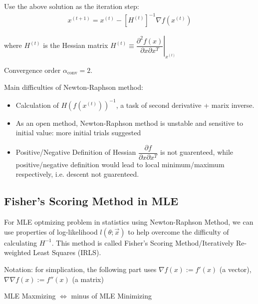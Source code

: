     Use the above solution as the iteration step:
    \begin{align}
        x^{(t+1)}=x^{(t)} - \left[H^{(t)}\right]^{-1}\nabla f(x^{(t)})
    \end{align}
    
    where $ H^{(t)} $ is the Hessian matrix $ H^{(t)}\equiv \left.\dfrac{\partial^{2}f(x) }{\partial x\partial x^T}\right|_{x^{(t)}} $
    
    Convergence order $ \alpha_\mathrm{conv} =2 $.

    \begin{point}
        Main difficulties of Newton-Raphson method: 
    \end{point}

    \begin{itemize}[topsep=2pt,itemsep=0pt]
        \item Calculation of $ H(f(x^{(t)}))^{-1} $, a task of second derivative + marix inverse.
        \item As an open method, Newton-Raphson  method is unstable and sensitive to initial value: more initial trials suggested
        \item Positive/Negative Definition of Hessian $ \dfrac{\partial f}{\partial x\partial x ^T} $ is not guarenteed, while positive/negative definition would lead to local minimum/maximum respectively, i.e. descent not guarenteed.
    \end{itemize}
    
        
    
\subsection{Fisher's Scoring Method in MLE}\label{SubSubSectionFisherScoringMethod}
    \hypertarget{FSNRMethod}{}For MLE optmizing problem in statistics using Newton-Raphson Method, we can use properties of log-likelihood $ l(\theta ;\vec{x}) $ to help overcome the difficulty of calculating $ H^{-1} $. This method is called Fisher's Scoring Method/Iteratively Re-weighted Least Squares (IRLS).

    Notation: for simplication, the following part uses $ \nabla f(x):=f'(x) $ (a vector), $ \nabla\nabla f(x):=f''(x) $ (a matrix)

\begin{point}
    MLE Maxmizing $ \Leftrightarrow $ minus of MLE Minimizing
\end{point}

